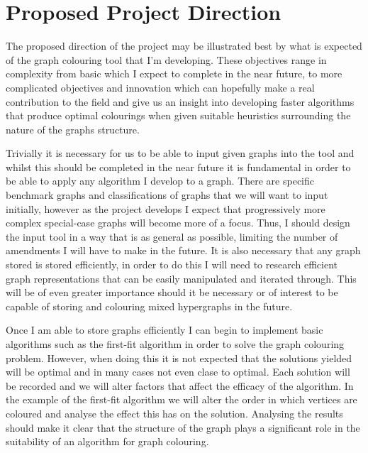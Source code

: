 \documentclass[12pt, a4paper]{article}
\begin{document}
{\section*{Proposed Project Direction}
\hspace{\parindent}The proposed direction of the project may be illustrated best by what is expected of the graph colouring tool that I'm developing. These objectives range in complexity from basic which I expect to complete in the near future, to more complicated objectives and innovation which can hopefully make a real contribution to the field and give us an insight into developing faster algorithms that produce optimal colourings when given suitable heuristics surrounding the nature of the graphs structure. \par
Trivially it is necessary for us to be able to input given graphs into the tool and whilst this should be completed in the near future it is fundamental in order to be able to apply any algorithm I develop to a graph. There are specific benchmark graphs and classifications of graphs that we will want to input initially, however as the project develops I expect that progressively more complex special-case graphs will become more of a focus. Thus, I should design the input tool in a way that is as general as possible, limiting the number of amendments I will have to make in the future. It is also necessary that any graph stored is stored efficiently, in order to do this I will need to research efficient graph representations that can be easily manipulated and iterated through. This will be of even greater importance should it be necessary or of interest to be capable of storing and colouring mixed hypergraphs in the future. \par
Once I am able to store graphs efficiently I can begin to implement basic algorithms such as the first-fit algorithm in order to solve the graph colouring problem. However, when doing this it is not expected that the solutions yielded will be optimal and in many cases not even clase to optimal. Each solution will be recorded and we will alter factors that affect the efficacy of the algorithm. In the example of the first-fit algorithm we will alter the order in which vertices are coloured and analyse the effect this has on the solution. Analysing the results should make it clear that the structure of the graph plays a significant role in the suitability of an algorithm for graph colouring.\par
}
\end{document}
